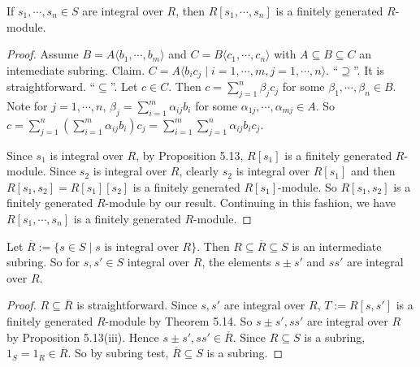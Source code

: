 \begin{theorem}
    If $s_1,\cdots,s_n \in S$ are integral over $R$, then $R[s_1,\cdots,s_n]$ is a finitely generated $R$-module. 
\end{theorem}

\begin{proof}
    Assume $B = A\langle b_1,\cdots,b_m \rangle$ and $C = B\langle c_1,\cdots,c_n \rangle$ with $A \subseteq B \subseteq C$ an intemediate subring. Claim. $C = A \langle b_ic_j \mid i = 1,\cdots,m, j = 1,\cdots,n\rangle$. ``$\supseteq$''. It is straightforward. ``$\subseteq$''. Let $c \in C$. Then $c = \sum_{j=1}^{n} \beta_jc_j$ for some $\beta_1,\cdots,\beta_n \in B$. Note for $j = 1,\cdots,n$, $\beta_j = \sum_{i=1}^{m} \alpha_{ij}b_i$ for some $\alpha_{1j},\cdots,\alpha_{mj} \in A$. So $c = \sum_{j=1}^{n}(\sum_{i=1}^{m}\alpha_{ij}b_i)c_j = \sum_{i=1}^{m}\sum_{j=1}^{n} \alpha_{ij}b_ic_j$. \par
    Since $s_1$ is integral over $R$, by Proposition 5.13, $R[s_1]$ is a finitely generated $R$-module. Since $s_2$ is integral over $R$, clearly $s_2$ is integral over $R[s_1]$ and then $R[s_1,s_2] = R[s_1][s_2]$ is a finitely generated $R[s_1]$-module. So $R[s_1,s_2]$ is a finitely generated $R$-module by our result. Continuing in this fashion, we have $R[s_1,\cdots,s_n]$ is a finitely generated $R$-module.
\end{proof}

\begin{theorem}
    Let $\overbar{R} := \{s \in S \mid s \text{ is integral over }R\}$. Then $R \subseteq \overbar{R} \subseteq S$ is an intermediate subring. So for $s,s' \in S$ integral over $R$, the elements $s \pm s'$ and $ss'$ are integral over $R$.
\end{theorem}

\begin{proof}
    $R \subseteq \overbar{R}$ is straightforward. Since $s,s'$ are integral over $R$, $T := R[s,s']$ is a finitely generated $R$-module by Theorem 5.14. So $s \pm s',ss'$ are integral over $R$ by Proposition 5.13(iii). Hence $s \pm s', ss' \in \overbar{R}$. Since $R \subseteq S$ is a subring, $1_S = 1_R \in \overbar{R}$. So by subring test, $\overbar{R} \subseteq S$ is a subring. 
\end{proof}

